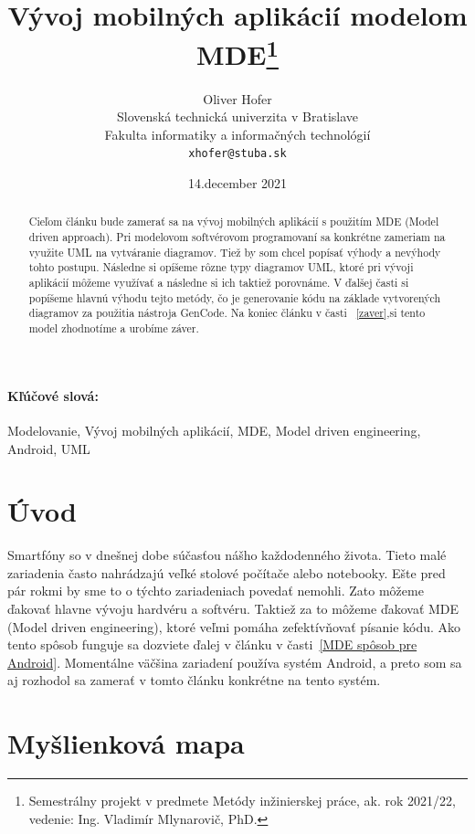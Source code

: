 \documentclass[10pt,twoside,slovak,a4paper]{article}
\title{Vývoj mobilných aplikácií modelom MDE\thanks{Semestrálny projekt v predmete Metódy inžinierskej práce, ak. rok 2021/22, vedenie: Ing. Vladimír Mlynarovič, PhD.}} %
\author{Oliver Hofer\\[2pt]
	{\small Slovenská technická univerzita v Bratislave}\\
	{\small Fakulta informatiky a informačných technológií}\\
	{\small \texttt{xhofer@stuba.sk}}
	}
\date{\small 14.december  2021} %
\begin{document}
\maketitle

\begin{abstract}
Cieľom článku bude zamerať sa na vývoj mobilných aplikácií s použitím MDE (Model driven approach). Pri modelovom softvérovom programovaní sa konkrétne zameriam na využite UML na vytváranie diagramov. Tiež by som chcel popísať výhody a nevýhody tohto postupu. Následne si opíšeme rôzne typy diagramov UML, ktoré pri vývoji aplikácií môžeme využívať a následne si ich taktiež porovnáme. V ďalšej časti si popíšeme hlavnú výhodu tejto metódy, čo je generovanie kódu na základe vytvorených diagramov za použitia nástroja GenCode. Na koniec článku v časti ~\ref{zaver},si tento model zhodnotíme a urobíme záver.
\end{abstract}
\paragraph{Kľúčové slová:} Modelovanie, Vývoj mobilných aplikácií, MDE, Model driven engineering, Android, UML


\section{Úvod}
\cite{2012}
Smartfóny so v dnešnej dobe súčasťou nášho každodenného života. Tieto malé zariadenia často nahrádzajú veľké stolové počítače alebo notebooky. Ešte pred pár rokmi by sme to o týchto zariadeniach povedať nemohli. Zato môžeme ďakovať hlavne vývoju hardvéru a softvéru. \newline
Taktiež za to môžeme ďakovať MDE (Model driven engineering), ktoré veľmi pomáha zefektívňovať písanie kódu. Ako tento spôsob funguje sa dozviete ďalej v článku v časti~\ref{MDE spôsob pre Android}.\newline
Momentálne väčšina zariadení používa systém Android, a preto som sa aj rozhodol sa zamerať v tomto článku konkrétne na tento systém.

\newpage
\section{Myšlienková mapa} \label{Myšlienková mapa}
\end{document}
